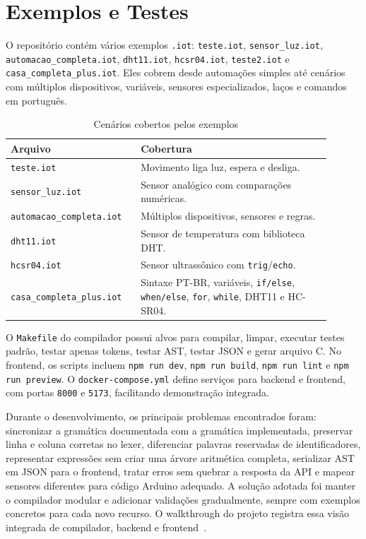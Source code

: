 \documentclass[conference]{IEEEtran}
\begin{document}
\section{Exemplos e Testes}
O repositório contém vários exemplos \texttt{.iot}: \texttt{teste.iot}, \texttt{sensor\_luz.iot}, \texttt{automacao\_completa.iot}, \texttt{dht11.iot}, \texttt{hcsr04.iot}, \texttt{teste2.iot} e \texttt{casa\_completa\_plus.iot}. Eles cobrem desde automações simples até cenários com múltiplos dispositivos, variáveis, sensores especializados, laços e comandos em português.

\begin{table}[htbp]
\caption{Cenários cobertos pelos exemplos}
\label{tab:exemplos}
\centering
\begin{tabular}{p{0.35\linewidth}p{0.55\linewidth}}
\toprule
\textbf{Arquivo} & \textbf{Cobertura} \\
\midrule
\texttt{teste.iot} & Movimento liga luz, espera e desliga. \\
\texttt{sensor\_luz.iot} & Sensor analógico com comparações numéricas. \\
\texttt{automacao\_completa.iot} & Múltiplos dispositivos, sensores e regras. \\
\texttt{dht11.iot} & Sensor de temperatura com biblioteca DHT. \\
\texttt{hcsr04.iot} & Sensor ultrassônico com \texttt{trig}/\texttt{echo}. \\
\texttt{casa\_completa\_plus.iot} & Sintaxe PT-BR, variáveis, \texttt{if/else}, \texttt{when/else}, \texttt{for}, \texttt{while}, DHT11 e HC-SR04. \\
\bottomrule
\end{tabular}
\end{table}

O \texttt{Makefile} do compilador possui alvos para compilar, limpar, executar testes padrão, testar apenas tokens, testar AST, testar JSON e gerar arquivo C. No frontend, os scripts incluem \texttt{npm run dev}, \texttt{npm run build}, \texttt{npm run lint} e \texttt{npm run preview}. O \texttt{docker-compose.yml} define serviços para backend e frontend, com portas \texttt{8000} e \texttt{5173}, facilitando demonstração integrada.

Durante o desenvolvimento, os principais problemas encontrados foram: sincronizar a gramática documentada com a gramática implementada, preservar linha e coluna corretas no lexer, diferenciar palavras reservadas de identificadores, representar expressões sem criar uma árvore aritmética completa, serializar AST em JSON para o frontend, tratar erros sem quebrar a resposta da API e mapear sensores diferentes para código Arduino adequado. A solução adotada foi manter o compilador modular e adicionar validações gradualmente, sempre com exemplos concretos para cada novo recurso. O walkthrough do projeto registra essa visão integrada de compilador, backend e frontend~\cite{docs-project}.
\end{document}
